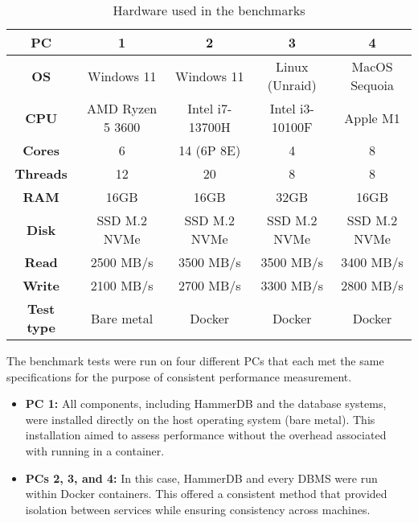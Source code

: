 \begin{table}[h!]
    \centering
    \begin{tabular}{|c|c|c|c|c|}
        \hline
        \textbf{PC}        & \textbf{1}       & \textbf{2}      & \textbf{3}      & \textbf{4}    \\
        \hline
        \textbf{OS}        & Windows 11       & Windows 11      & Linux (Unraid)  & MacOS Sequoia \\
        \hline
        \textbf{CPU}       & AMD Ryzen 5 3600 & Intel i7-13700H & Intel i3-10100F & Apple M1      \\
        \hline
        \textbf{Cores}     & 6                & 14 (6P 8E)      & 4               & 8             \\
        \hline
        \textbf{Threads}   & 12               & 20              & 8               & 8             \\
        \hline
        \textbf{RAM}       & 16GB             & 16GB            & 32GB            & 16GB          \\
        \hline
        \textbf{Disk}      & SSD M.2 NVMe     & SSD M.2 NVMe    & SSD M.2 NVMe    & SSD M.2 NVMe  \\
        \hline
        \textbf{Read}      & 2500 MB/s        & 3500 MB/s       & 3500 MB/s       & 3400 MB/s     \\
        \hline
        \textbf{Write}     & 2100 MB/s        & 2700 MB/s       & 3300 MB/s       & 2800 MB/s     \\
        \hline
        \textbf{Test type} & Bare metal       & Docker          & Docker          & Docker        \\
        \hline
    \end{tabular}
    \caption{Hardware used in the benchmarks}
    \label{tab:hardware-setup}
\end{table}

The benchmark tests were run on four different PCs that each met the same specifications for the purpose of consistent performance measurement.

\begin{itemize}
    \item \textbf{PC 1:} All components, including HammerDB and the database systems, were installed directly on the host operating system (bare metal). This installation aimed to assess performance without the overhead associated with running in a container.
    
    \item \textbf{PCs 2, 3, and 4:} In this case, HammerDB and every DBMS were run within Docker containers. This offered a consistent method that provided isolation between services while ensuring consistency across machines.
\end{itemize}

